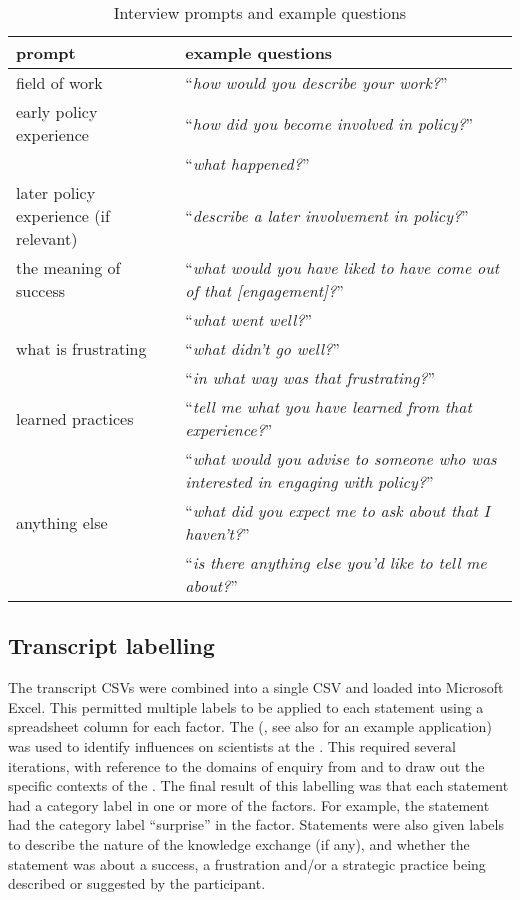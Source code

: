 \begin{table}
    \footnotesize
    \caption{Interview prompts and example questions}\label{tab:metinterview}
    \begin{tabular}{L{.4\linewidth}L{.6\linewidth}} 
    \textbf{prompt} & \textbf{example questions} \\ \hline
    field of work & ``\textit{how would you describe your work?}'' \rule[-2ex]{0pt}{6ex}\\
    early policy experience & ``\textit{how did you become involved in policy?}'' \\
     & ``\textit{what happened?}'' \\\rule{0pt}{4ex}
    later policy experience (if relevant) & ``\textit{describe a later involvement in policy?}'' \\\rule{0pt}{4ex}
    the meaning of success & ``\textit{what would you have liked to have come out of that [engagement]?}''\\
     & ``\textit{what went well?}'' \\\rule{0pt}{4ex}
    what is frustrating & ``\textit{what didn't go well?}'' \\
     & ``\textit{in what way was that frustrating?}''\\\rule{0pt}{4ex}
    learned practices  & ``\textit{tell me what you have learned from that experience?}'' \\
     & ``\textit{what would you advise to someone who was interested in engaging with policy?}''\\\rule{0pt}{4ex}
    anything else & ``\textit{what did you expect me to ask about that I haven't?}'' \\
     & ``\textit{is there anything else you'd like to tell me about?}'' \\[2ex] \hline
    \end{tabular}
\end{table}

\subsection{Transcript labelling}\label{sec:metlabelling}

The transcript CSVs were combined into a single CSV and loaded into Microsoft Excel. This permitted multiple labels to be applied to each statement using a spreadsheet column for each factor. The \ISM{} (\cite{DarntonH2013}, see also \cite{MinamitaniDOI2024} for an example application) was used to identify influences on scientists at the \SPI. This required several iterations, with reference to the domains of enquiry from \textcite{BuseMW2012} and \textcite{HaynesDCRHGS2011} to draw out the specific contexts of the \SPI. The final result of this labelling was that each statement had a category label in one or more of the \ISM{} factors. For example, the statement  had the category label ``surprise'' in the \ismie{} factor. Statements were also given labels to describe the nature of the knowledge exchange (if any), and whether the statement was about a success, a frustration and/or a strategic practice being described or suggested by the participant.

